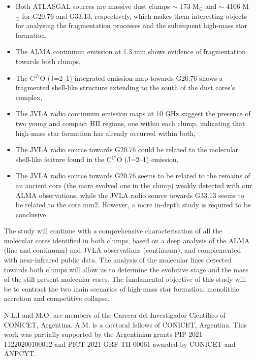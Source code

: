 \documentclass[baaa]{baaa}
\begin{document}
\begin{itemize}

\item Both ATLASGAL sources are massive dust clumps $\sim$ 173 M$_\odot$ and $\sim$ 4106 M$_\odot$ for G20.76 and G33.13, respectively, which makes them interesting objects for analysing the fragmentation processes and the subsequent high-mass star formation,  
\item The ALMA continuum emission at 1.3 mm shows evidence of fragmentation towards both clumps, 
\item  The C$^{17}$O (J=2--1) integrated emission map towards G20.76 shows a fragmented shell-like structure extending to the south of the dust cores’s complex,
\item The JVLA radio continuum emission maps at 10 GHz suggest the presence of two young and compact HII regions, one within each clump, indicating that high-mass star formation has already occurred within both,
\item The JVLA radio source towards G20.76 could be related to the molecular shell-like feature found in the C$^{17}$O (J=2--1) emission,
\item The JVLA radio source towards G20.76 seems to be related to the remains of an ancient core (the more evolved one in the clump) weakly detected with our ALMA observations, while  the JVLA radio source towards G33.13 seems to be related to the core mm2. However, a more in-depth study is required to be conclusive. 

\end{itemize}

The study will continue with a comprehensive characterisation of all the molecular cores identified in both clumps, based on a deep analysis of the ALMA (line and continuum) and JVLA observations (continuum), and complemented with near-infrared public data. The analysis of the molecular lines detected towards both clumps will allow us to determine the evolutive stage and the mass of the still present molecular cores.
The fundamental objective of this study will be to contrast the two main scenarios of high-mass star formation: monolithic accretion and competitive collapse.   


\begin{acknowledgement}
N.L.I and M.O. are members of the Carrera del Investigador Científico of CONICET, Argentina. A.M. is a doctoral fellows of CONICET, Argentina. This work was partially supported by the Argentinian grants PIP 2021 11220200100012 and PICT 2021-GRF-TII-00061 awarded by CONICET and ANPCYT. 
\end{acknowledgement}
\end{document}
